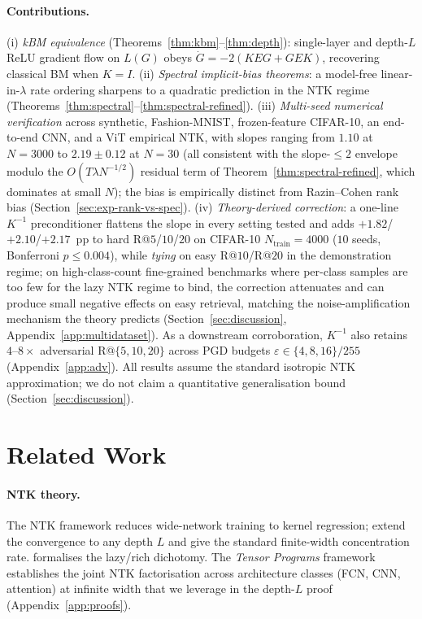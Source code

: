 \documentclass{article}
\newcommand{\E}{E}
\begin{document}
\paragraph{Contributions.}
(i) \emph{kBM equivalence} (Theorems~\ref{thm:kbm}--\ref{thm:depth}):
single-layer and depth-$L$ ReLU gradient flow on $L(G)$ obeys
$\dot G = -2(K\E G + G\E K)$, recovering classical BM when $K=I$.
(ii) \emph{Spectral implicit-bias theorems}: a model-free
linear-in-$\lambda$ rate ordering sharpens to a quadratic prediction
in the NTK regime (Theorems~\ref{thm:spectral}--\ref{thm:spectral-refined}).
(iii) \emph{Multi-seed numerical verification} across synthetic,
Fashion-MNIST, frozen-feature CIFAR-10, an end-to-end CNN, and a ViT
empirical NTK, with slopes ranging from $1.10$ at $N{=}3000$ to
$2.19 \pm 0.12$ at $N{=}30$ (all consistent with the slope-$\leq 2$
envelope modulo the $O(T \lambda N^{-1/2})$ residual term of
Theorem~\ref{thm:spectral-refined}, which dominates at small $N$);
the bias is empirically distinct from Razin--Cohen rank bias
(Section~\ref{sec:exp-rank-vs-spec}).
(iv) \emph{Theory-derived correction}: a one-line $K^{-1}$ preconditioner
flattens the slope in every setting tested and adds
$+1.82$/$+2.10$/$+2.17$~pp to hard R@$5$/$10$/$20$ on CIFAR-10
$N_{\mathrm{train}}\!=\!4000$ ($10$ seeds, Bonferroni $p\leq 0.004$),
while \emph{tying} on easy R@$10$/R@$20$ in the demonstration regime;
on high-class-count fine-grained benchmarks where per-class samples
are too few for the lazy NTK regime to bind, the correction
attenuates and can produce small negative effects on easy retrieval,
matching the noise-amplification mechanism the theory predicts
(Section~\ref{sec:discussion}, Appendix~\ref{app:multidataset}). As
a downstream corroboration, $K^{-1}$ also retains
$4$--$8\times$ adversarial R@$\{5,10,20\}$ across PGD budgets
$\varepsilon\!\in\!\{4,8,16\}/255$ (Appendix~\ref{app:adv}).
All results assume the standard isotropic NTK approximation; we do
not claim a quantitative generalisation bound
(Section~\ref{sec:discussion}).

\section{Related Work}
\label{sec:related}

\paragraph{NTK theory.}
The NTK framework \citep{jacot2018neural} reduces wide-network training
to kernel regression; \citet{lee2019wide} extend the convergence to any
depth $L$ and give the standard finite-width concentration rate.
\citet{chizat2020implicit} formalises the lazy/rich dichotomy. The
\emph{Tensor Programs} framework \citep{yang2020tensor} establishes
the joint NTK factorisation across architecture classes (FCN, CNN,
attention) at infinite width that we leverage in the depth-$L$ proof
(Appendix~\ref{app:proofs}).
\end{document}

